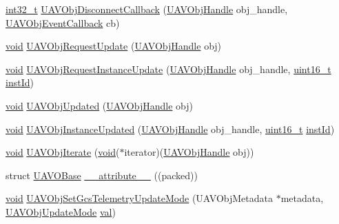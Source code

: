 \begin{DoxyCompactItemize}
\item 
\hyperlink{group___n_a_m_e_gafd12020da5a235dfcf0c3c748fb5baed}{int32\-\_\-t} \hyperlink{group___u_a_v_gadfa431fdf460097d8a6aa13f0a722ac0}{U\-A\-V\-Obj\-Disconnect\-Callback} (\hyperlink{group___n_a_m_e_gac31715ab50a1903838e7d87c8022ec75}{U\-A\-V\-Obj\-Handle} obj\-\_\-handle, \hyperlink{group___u_a_v_ga33d11560e38b56dc904220fb0f785c28}{U\-A\-V\-Obj\-Event\-Callback} cb)
\item 
\hyperlink{group___n_a_m_e_ga18028b8badbf1ea7e704ccac3c488e82}{void} \hyperlink{group___u_a_v_ga8b46dc623479a85565183d28b437fdb4}{U\-A\-V\-Obj\-Request\-Update} (\hyperlink{group___n_a_m_e_gac31715ab50a1903838e7d87c8022ec75}{U\-A\-V\-Obj\-Handle} obj)
\item 
\hyperlink{group___n_a_m_e_ga18028b8badbf1ea7e704ccac3c488e82}{void} \hyperlink{group___u_a_v_ga178c0681bdf228a409bcd12d8a10a260}{U\-A\-V\-Obj\-Request\-Instance\-Update} (\hyperlink{group___n_a_m_e_gac31715ab50a1903838e7d87c8022ec75}{U\-A\-V\-Obj\-Handle} obj\-\_\-handle, \hyperlink{stdint_8h_a273cf69d639a59973b6019625df33e30}{uint16\-\_\-t} \hyperlink{group___n_a_m_e_ga874457c6d2526c90ec75fa5a37d687ca}{inst\-Id})
\item 
\hyperlink{group___n_a_m_e_ga18028b8badbf1ea7e704ccac3c488e82}{void} \hyperlink{group___u_a_v_ga2720fb6650346665660ae1507400ac11}{U\-A\-V\-Obj\-Updated} (\hyperlink{group___n_a_m_e_gac31715ab50a1903838e7d87c8022ec75}{U\-A\-V\-Obj\-Handle} obj)
\item 
\hyperlink{group___n_a_m_e_ga18028b8badbf1ea7e704ccac3c488e82}{void} \hyperlink{group___u_a_v_ga90b88ba1823a707558d3056663d0c0c9}{U\-A\-V\-Obj\-Instance\-Updated} (\hyperlink{group___n_a_m_e_gac31715ab50a1903838e7d87c8022ec75}{U\-A\-V\-Obj\-Handle} obj\-\_\-handle, \hyperlink{stdint_8h_a273cf69d639a59973b6019625df33e30}{uint16\-\_\-t} \hyperlink{group___n_a_m_e_ga874457c6d2526c90ec75fa5a37d687ca}{inst\-Id})
\item 
\hyperlink{group___n_a_m_e_ga18028b8badbf1ea7e704ccac3c488e82}{void} \hyperlink{group___u_a_v_ga207c169e5af27b411cb6a08608369bdb}{U\-A\-V\-Obj\-Iterate} (\hyperlink{group___n_a_m_e_ga18028b8badbf1ea7e704ccac3c488e82}{void}($\ast$iterator)(\hyperlink{group___n_a_m_e_gac31715ab50a1903838e7d87c8022ec75}{U\-A\-V\-Obj\-Handle} obj))
\item 
struct \hyperlink{struct_u_a_v_o_base}{U\-A\-V\-O\-Base} \hyperlink{group___u_a_v_ga4b0485179787b019d9da516583780bdf}{\-\_\-\-\_\-attribute\-\_\-\-\_\-} ((packed))
\item 
\hyperlink{group___n_a_m_e_ga18028b8badbf1ea7e704ccac3c488e82}{void} \hyperlink{group___u_a_v_gaf23cc9b03d0eaa4dbf1aec969180f712}{U\-A\-V\-Obj\-Set\-Gcs\-Telemetry\-Update\-Mode} (U\-A\-V\-Obj\-Metadata $\ast$metadata, \hyperlink{group___u_a_v_gafd571f69747daf7681eb869270e27208}{U\-A\-V\-Obj\-Update\-Mode} \hyperlink{group___p_i_o_s___t_i_m_ga757344f09097232d715d55cbf9d61a43}{val})
\end{DoxyCompactItemize}
